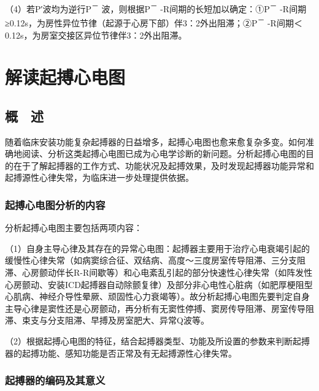 （4）若P′波均为逆行P\textsuperscript{－} 波，则根据P\textsuperscript{－}
-R间期的长短加以确定：①P\textsuperscript{－}
-R间期≥0.12s，为房性异位节律（起源于心房下部）伴3：2外出阻滞；②P\textsuperscript{－}
-R间期＜0.12s，为房室交接区异位节律伴3：2外出阻滞。

\protect\hypertarget{text00045.html}{}{}

\protect\hypertarget{text00045.htmlux5cux23chapter45}{}{}

\chapter{解读起搏心电图}

\protect\hypertarget{text00045.htmlux5cux23subid486}{}{}

\section{概　述}

随着临床安装功能复杂起搏器的日益增多，起搏心电图也愈来愈复杂多变。如何准确地阅读、分析这类起搏心电图已成为心电学诊断的新问题。分析起搏心电图的目的在于了解起搏器的工作方式、功能状况及起搏效果，及时发现起搏器功能异常和起搏源性心律失常，为临床进一步处理提供依据。

\protect\hypertarget{text00045.htmlux5cux23subid487}{}{}

\subsection{起搏心电图分析的内容}

分析起搏心电图主要包括两项内容：

（1）自身主导心律及其存在的异常心电图：起搏器主要用于治疗心电衰竭引起的缓慢性心律失常（如病窦综合征、双结病、高度～三度房室传导阻滞、三分支阻滞、心房颤动伴长R-R间歇等）和心电紊乱引起的部分快速性心律失常（如阵发性心房颤动、安装ICD起搏器自动除颤复律）及部分非心电性心脏病（如肥厚梗阻型心肌病、神经介导性晕厥、顽固性心力衰竭等）。故分析起搏心电图先要判定自身主导心律是窦性还是心房颤动，再分析有无窦性停搏、窦房传导阻滞、房室传导阻滞、束支与分支阻滞、早搏及房室肥大、异常Q波等。

（2）根据起搏心电图的特征，结合起搏器类型、功能及所设置的参数来判断起搏器的起搏功能、感知功能是否正常及有无起搏源性心律失常。

\protect\hypertarget{text00045.htmlux5cux23subid488}{}{}

\subsection{起搏器的编码及其意义}

